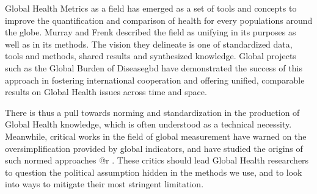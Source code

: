 Global Health Metrics as a field has emerged as a set of tools and concepts to improve the quantification and comparison of health for every populations around the globe. Murray and Frenk described the field as unifying in its purposes as well as in its methods\citep{murray_health_2008}. The vision they delineate is one of standardized data, tools and methods, shared results and synthesized knowledge. Global projects such as the Global Burden of Disease\gls{gbd} have demonstrated the success of this approach in fostering international cooperation and offering unified, comparable results on Global Health issues across time and space.



There is thus a pull towards norming and standardization in the production of Global Health knowledge, which is often understood as a technical necessity. Meanwhile, critical works in the field of global measurement have warned on the oversimplification provided by global indicators, and have studied the origins of such normed approaches\citep{merry_measuring_2011,rottenburg_world_2016} @r . These critics should lead Global Health researchers to question the political assumption hidden in the methods we use, and to look into ways to mitigate their most stringent limitation.

